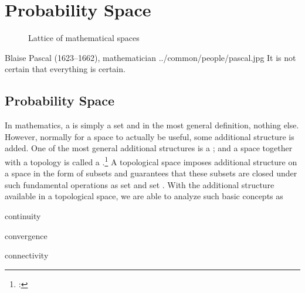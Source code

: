 ﻿%

\chapter{Probability Space}
\label{chp:prbspace}

\begin{figure}[th]
  \centering
  
  \caption{Lattice of mathematical spaces\label{fig:vector_spaces}}
\end{figure}%


\qboxnps
  {
    Blaise Pascal (1623--1662), mathematician
    \footnotemark
  }
  {../common/people/pascal.jpg}
  {It is not certain that everything is certain.}


\section{Probability Space}
In mathematics, a  is simply a set and in the most general definition,
nothing else.
However, normally for a space to actually be useful, some additional structure is added.
One of the most general additional structures is a ;
and a space together with a topology is called a
.\footnote{: }
A topological space imposes additional structure on a space  in the form of subsets
and guarantees that these subsets are closed under such fundamental operations as
set  and set .
With the additional structure available in a topological space, we are able to
analyze such basic concepts as
  \begin{liste}
    \item continuity
    \item convergence
    \item connectivity
  \end{liste}

